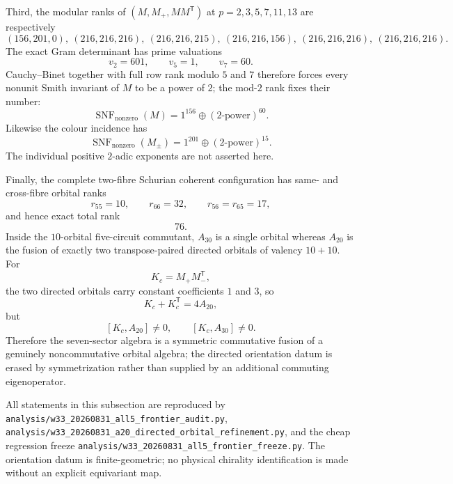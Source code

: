 Third, the modular ranks of $(M,M_+,MM^{\mathsf T})$ at $p=2,3,5,7,11,13$ are respectively
\[
(156,201,0),\ (216,216,216),\ (216,216,215),\ (216,216,156),\ (216,216,216),\ (216,216,216).
\]
The exact Gram determinant has prime valuations
\[
v_2=601,\qquad v_5=1,\qquad v_7=60.
\]
Cauchy--Binet together with full row rank modulo $5$ and $7$ therefore forces every nonunit Smith invariant of $M$ to be a power of $2$; the mod-$2$ rank fixes their number:
\[
\boxed{\operatorname{SNF}_{\mathrm{nonzero}}(M)=1^{156}\oplus(2\text{-power})^{60}.}
\]
Likewise the colour incidence has
\[
\boxed{\operatorname{SNF}_{\mathrm{nonzero}}(M_\pm)=1^{201}\oplus(2\text{-power})^{15}.}
\]
The individual positive $2$-adic exponents are not asserted here.

Finally, the complete two-fibre Schurian coherent configuration has same- and cross-fibre orbital ranks
\[
r_{55}=10,\qquad r_{66}=32,\qquad r_{56}=r_{65}=17,
\]
and hence exact total rank
\[
\boxed{76}.
\]
Inside the $10$-orbital five-circuit commutant, $A_{30}$ is a single orbital whereas $A_{20}$ is the fusion of exactly two transpose-paired directed orbitals of valency $10+10$.  For
\[
K_c=M_+M_-^{\mathsf T},
\]
the two directed orbitals carry constant coefficients $1$ and $3$, so
\[
\boxed{K_c+K_c^{\mathsf T}=4A_{20}},
\]
but
\[
[K_c,A_{20}]\neq0,\qquad [K_c,A_{30}]\neq0.
\]
Therefore the seven-sector algebra is a symmetric commutative fusion of a genuinely noncommutative orbital algebra; the directed orientation datum is erased by symmetrization rather than supplied by an additional commuting eigenoperator.

All statements in this subsection are reproduced by
\texttt{analysis/w33\_20260831\_all5\_frontier\_audit.py},
\texttt{analysis/w33\_20260831\_a20\_directed\_orbital\_refinement.py}, and the cheap regression freeze
\texttt{analysis/w33\_20260831\_all5\_frontier\_freeze.py}.  The orientation datum is finite-geometric; no physical chirality identification is made without an explicit equivariant map.
